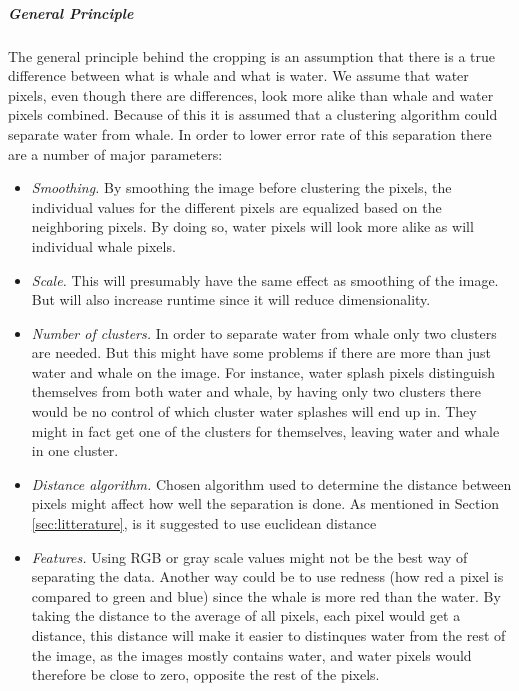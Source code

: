 \subparagraph{General Principle}
The general principle behind the cropping is an assumption that there is a true difference between what is whale and what is water. We assume that water pixels, even though there are differences, look more alike than whale and water pixels combined.
Because of this it is assumed that a clustering algorithm could separate water from whale.
In order to lower error rate of this separation there are a number of major parameters:
\begin{itemize}
\item \textit{Smoothing.} By smoothing the image before clustering the pixels, the individual values for the different pixels are equalized based on the neighboring pixels. By doing so, water pixels will look more alike as will individual whale pixels.
\item \textit{Scale.} This will presumably have the same effect as smoothing of the image. But will also increase runtime since it will reduce dimensionality.  
\item \textit{Number of clusters.} In order to separate water from whale only two clusters are needed. But this might have some problems if there are more than just water and whale on the image. For instance, water splash pixels distinguish themselves from both water and whale, by having only two clusters there would be no control of which cluster water splashes will end up in. They might in fact get one of the clusters for themselves, leaving water and whale in one cluster.
\item \textit{Distance algorithm.} Chosen algorithm used to determine the distance between pixels might affect how well the separation is done. As mentioned in Section \ref{sec:litterature}, is it suggested to use euclidean distance
\item \textit{Features.} Using RGB or gray scale values might not be the best way of separating the data. Another way could be to use redness (how red a pixel is compared to green and blue) since the whale is more red than the water. By taking the distance to the average of all pixels, each pixel would get a distance, this distance will make it easier to distinques water from the rest of the image, as the images mostly contains water, and water pixels would therefore be close to zero, opposite the rest of the pixels.
\end{itemize}
